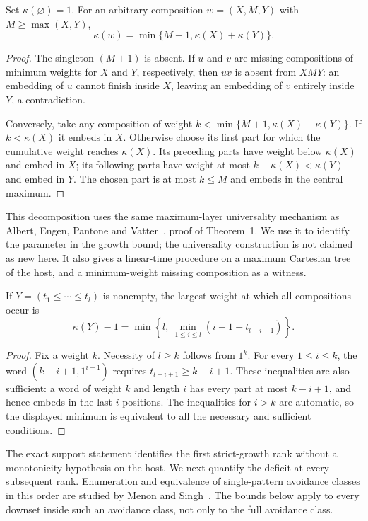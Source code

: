 \begin{lemma}
Set $\kappa(\varnothing)=1$. For an arbitrary composition
$w=(X,M,Y)$ with $M\ge\max(X,Y)$,
\[
 \kappa(w)=\min\{M+1,\kappa(X)+\kappa(Y)\}.
\]
\end{lemma}
\begin{proof}
The singleton $(M+1)$ is absent. If $u$ and $v$ are missing compositions
of minimum weights for $X$ and $Y$, respectively, then $uv$ is absent
from $XMY$: an embedding of $u$ cannot finish inside $X$, leaving
an embedding of $v$ entirely inside $Y$, a contradiction.

Conversely, take any composition of weight
$k<\min\{M+1,\kappa(X)+\kappa(Y)\}$. If $k<\kappa(X)$ it embeds
in $X$. Otherwise choose its first part for which the cumulative weight
reaches $\kappa(X)$. Its preceding parts have weight below $\kappa(X)$
and embed in $X$; its following parts have weight at most
$k-\kappa(X)<\kappa(Y)$ and embed in $Y$. The chosen part is at most
$k\le M$ and embeds in the central maximum.
\end{proof}

This decomposition uses the same maximum-layer universality mechanism
as Albert, Engen, Pantone and Vatter~\cite{AlbertEtAl}, proof of Theorem~1.
We use it to identify the parameter in the growth
bound; the universality construction is not claimed as new here.
It also gives a linear-time procedure on a maximum Cartesian tree of
the host, and a minimum-weight missing composition as a witness.

\begin{proposition}
If $Y=(t_1\le\cdots\le t_l)$ is nonempty, the largest weight at which
all compositions occur is
\[
 \kappa(Y)-1=\min\left\{l,\ \min_{1\le i\le l}(i-1+t_{l-i+1})\right\}.
\]
\end{proposition}

\begin{proof}
Fix a weight $k$. Necessity of $l\ge k$ follows from $1^k$. For every
$1\le i\le k$, the word $(k-i+1,1^{i-1})$ requires
$t_{l-i+1}\ge k-i+1$. These inequalities are also sufficient: a word
of weight $k$ and length $i$ has every part at most $k-i+1$, and hence
embeds in the last $i$ positions. The inequalities for $i>k$ are
automatic, so the displayed minimum is equivalent to all the necessary
and sufficient conditions.
\end{proof}

The exact support statement identifies the first strict-growth rank
without a monotonicity hypothesis on the host. We next quantify the
deficit at every subsequent rank.
Enumeration and equivalence of single-pattern avoidance classes in
this order are studied by Menon and Singh~\cite{MenonSingh}. The
bounds below apply to every downset inside such an avoidance class,
not only to the full avoidance class.

